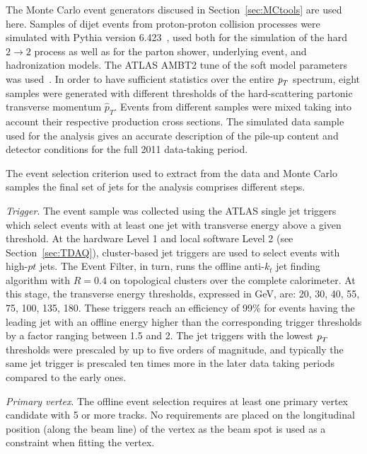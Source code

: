 The Monte Carlo event generators discused in Section~\ref{sec:MCtools} are used here. Samples of dijet events from proton-proton collision processes were simulated with {\sc Pythia} version 6.423~\cite{PYTHIA6}, used both for the simulation of the hard $2\rightarrow 2$ process as well as for the parton shower, underlying event, and hadronization models. The ATLAS AMBT2 tune of the soft model parameters was used~\cite{Pythia_MC11tune}.
In order to have sufficient statistics over the entire ${\emph{p}_{T}}$ spectrum, eight samples were generated with different thresholds of the hard-scattering partonic transverse momentum $\hat{p}_T$. Events from different samples were mixed taking into account their respective production cross sections.
The simulated data sample used for the analysis %
gives an accurate description of the pile-up content and detector conditions for the full 2011 data-taking period. 



The event selection criterion used to extract from the data and Monte Carlo samples the final set of jets for the analysis comprises different steps. 

\emph{Trigger}. The event sample was collected  using the ATLAS single jet triggers which select events with at least one jet with transverse energy above a given threshold.  At the hardware Level 1 and local software Level 2 (see Section~\ref{sec:TDAQ}), cluster-based jet triggers are used to select events with high-$pt$ jets. The Event Filter, in turn, runs  the offline anti-$k_t$ jet finding algorithm with $R = 0.4$ on topological clusters over the complete calorimeter.  At this stage, the transverse energy thresholds, expressed in GeV, are: 20, 30, 40, 55, 75, 100, 135, 180. These triggers reach an efficiency of 99\% for events having the leading jet with an offline energy higher than the corresponding trigger thresholds by a factor ranging between 1.5 and 2. The jet triggers with the lowest ${\emph{p}_{T}}$ thresholds were prescaled by up to five orders of magnitude, and typically the same jet trigger is prescaled ten times more in the later data taking periods compared to the early ones. 

\emph{Primary vertex}.  The offline event selection requires at least one primary vertex candidate with 5 or more tracks.  No requirements are placed on the longitudinal position (along the beam line) of the vertex as the beam spot is used as a constraint when fitting the vertex. 


